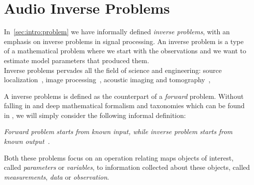 



\section{Audio Inverse Problems}\label{sec:processing:inverse}
\cite{kitic2015cosparse}
In~\cref{sec:intro:problem} we have informally defined \textit{inverse problems}, with an emphasis on inverse problems in signal processing.
An inverse problem is a type of a mathematical problem where we start with the observations and we want to estimate model parameters that produced them.
\\Inverse problems pervades all the field of science and engineering:
source localization~\cite{},
image processing~\cite{},
acoustic imaging and tomography~\cite{},

A inverse problems is defined as the counterpart of a \textit{forward} problem.
Without falling in and deep mathematical formalism and taxonomies which can be found in ,
we will simply consider the following informal definition:
\begin{center}
    \textit{\emph{Forward problem} starts from known input, while \emph{inverse problem} starts from known output~\cite{santamarina2005discrete}.}
\end{center}
Both these problems focus on an operation relating maps objects of interest, called \textit{parameters} or \textit{variables},
to information collected about these objects, called \textit{measurements}, \textit{data} or \textit{observation}.

